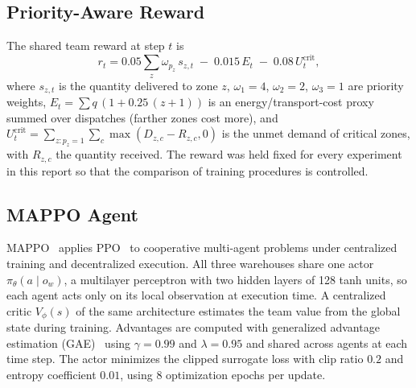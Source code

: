\documentclass[conference]{IEEEtran}
\begin{document}
\subsection{Priority-Aware Reward}
The shared team reward at step $t$ is
\begin{equation}
r_t = 0.05\sum_{z} \omega_{p_z}\, s_{z,t} \;-\; 0.015\, E_t \;-\; 0.08\, U^{\mathrm{crit}}_t ,
\label{eq:reward}
\end{equation}
where $s_{z,t}$ is the quantity delivered to zone $z$, $\omega_{1}=4$, $\omega_{2}=2$, $\omega_{3}=1$ are priority weights, $E_t=\sum q\,(1+0.25\,(z+1))$ is an energy/transport-cost proxy summed over dispatches (farther zones cost more), and $U^{\mathrm{crit}}_t=\sum_{z:p_z=1}\sum_c \max(D_{z,c}-R_{z,c},0)$ is the unmet demand of critical zones, with $R_{z,c}$ the quantity received. The reward was held fixed for every experiment in this report so that the comparison of training procedures is controlled.

\subsection{MAPPO Agent}
MAPPO~\cite{b6} applies PPO~\cite{b7} to cooperative multi-agent problems under centralized training and decentralized execution. All three warehouses share one actor $\pi_\theta(a\mid o_w)$, a multilayer perceptron with two hidden layers of 128 tanh units, so each agent acts only on its local observation at execution time. A centralized critic $V_\phi(s)$ of the same architecture estimates the team value from the global state during training. Advantages are computed with generalized advantage estimation (GAE)~\cite{b8} using $\gamma=0.99$ and $\lambda=0.95$ and shared across agents at each time step. The actor minimizes the clipped surrogate loss with clip ratio $0.2$ and entropy coefficient $0.01$, using 8 optimization epochs per update.
\end{document}
